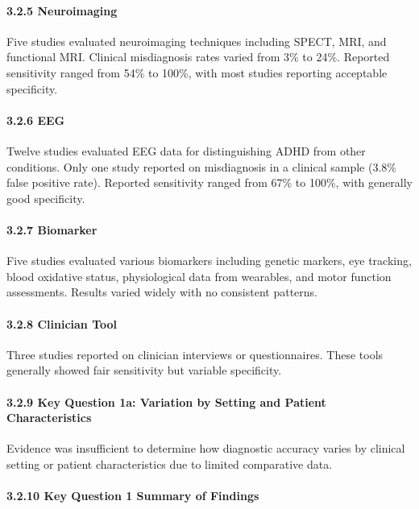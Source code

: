 \documentclass[
  12pt,
  letterpaper,
]{article}
\renewcommand{\[}{\begin{singlespace}\oldDisplayMath}
\renewcommand{\]}{\endoldDisplayMath\end{singlespace}\vspace{\baselineskip}}
\begin{document}
\paragraph{3.2.5 Neuroimaging}\label{neuroimaging}

Five studies evaluated neuroimaging techniques including SPECT, MRI, and
functional MRI. Clinical misdiagnosis rates varied from 3\% to 24\%.
Reported sensitivity ranged from 54\% to 100\%, with most studies
reporting acceptable specificity.

\paragraph{3.2.6 EEG}\label{eeg}

Twelve studies evaluated EEG data for distinguishing ADHD from other
conditions. Only one study reported on misdiagnosis in a clinical sample
(3.8\% false positive rate). Reported sensitivity ranged from 67\% to
100\%, with generally good specificity.

\paragraph{3.2.7 Biomarker}\label{biomarker}

Five studies evaluated various biomarkers including genetic markers, eye
tracking, blood oxidative status, physiological data from wearables, and
motor function assessments. Results varied widely with no consistent
patterns.

\paragraph{3.2.8 Clinician Tool}\label{clinician-tool}

Three studies reported on clinician interviews or questionnaires. These
tools generally showed fair sensitivity but variable specificity.

\paragraph{3.2.9 Key Question 1a: Variation by Setting and Patient
Characteristics}\label{key-question-1a-variation-by-setting-and-patient-characteristics}

Evidence was insufficient to determine how diagnostic accuracy varies by
clinical setting or patient characteristics due to limited comparative
data.

\paragraph{3.2.10 Key Question 1 Summary of
Findings}\label{key-question-1-summary-of-findings}
\end{document}
